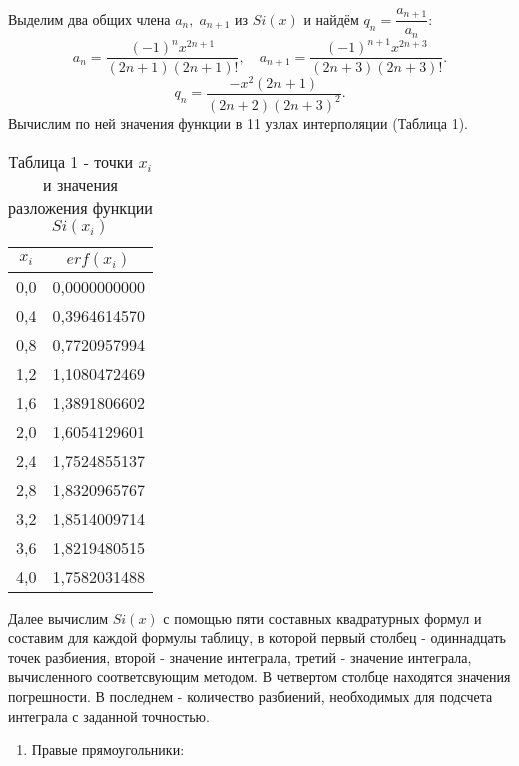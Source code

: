 \documentclass[a4paper,12pt]{article}
\begin{document}
{Выделим два общих члена $a_n, \; a_{n + 1}$ из $Si(x)$ и найдём $q_n = \dfrac{a_{n+1}}{a_n}$:
    \begin{equation}
        a_{n}=\frac{(-1)^{n}x^{2n+1}}{(2n+1)(2n+1)!}, \quad a_{n+1}=\frac{(-1)^{n+1}x^{2n+3}}{(2n+3)(2n+3)!}.
    \end{equation}
    \begin{equation}
        q_{n}=\frac{-x^{2}(2n+1)}{(2n+2)(2n+3)^2}.
    \end{equation}
Вычислим по ней значения функции в 11 узлах интерполяции (Таблица 1).
\begin{table}[h]
    \centering
    \begin{tabular}{|c|c|}
         \hline
        $x_i$ & $erf(x_i)$\\
        \hline
        0,0 & 0,0000000000\\
        \hline
        0,4 & 0,3964614570\\
        \hline
        0,8 & 0,7720957994\\
        \hline
        1,2 & 1,1080472469\\
        \hline
        1,6 & 1,3891806602\\
        \hline
        2,0 & 1,6054129601\\
        \hline
        2,4 & 1,7524855137\\
        \hline
        2,8 & 1,8320965767\\
        \hline
        3,2 & 1,8514009714\\
        \hline
        3,6 & 1,8219480515\\
        \hline
        4,0 & 1,7582031488\\
        \hline
    \end{tabular}
    \caption*{\small{Таблица 1 - точки $x_i$ и значения разложения функции $Si(x_i)$}}
\end{table}
\clearpage
Далее вычислим $Si(x)$ с помощью пяти составных квадратурных формул и соста\-вим для каждой формулы таблицу, в которой первый столбец - одиннадцать точек разбиения, второй - значение интеграла, третий - значение интеграла, вычисленного соответсвующим методом. В четвертом столбце находятся значения погрешности. В последнем - количество разбиений, необходимых для подсчета интеграла с заданной точностью.
\begin{enumerate}[label = \arabic*.]
    \item {Правые прямоугольники:
        \begin{table}[h]
          \centering
          \begin{tabular}{|c|c|c|c|c|}

\end{tabular}
\end{table}}
\end{enumerate}}
\end{document}
